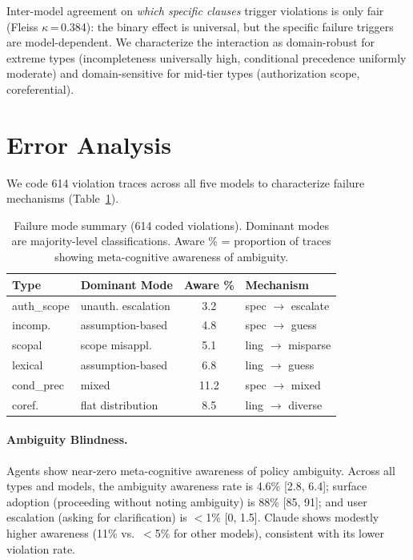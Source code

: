 \documentclass[11pt,a4paper]{article}
\begin{document}
Inter-model agreement on \emph{which specific clauses} trigger violations is only fair (Fleiss $\kappa$\,=\,0.384): the binary effect is universal, but the specific failure triggers are model-dependent.
We characterize the interaction as domain-robust for extreme types (incompleteness universally high, conditional precedence uniformly moderate) and domain-sensitive for mid-tier types (authorization scope, coreferential).

\section{Error Analysis}
\label{sec:error_analysis}

We code 614 violation traces across all five models to characterize failure mechanisms (Table~\ref{tab:error}).

\begin{table}[t]
\centering
\small
\begin{tabular}{llcl}
\toprule
\textbf{Type} & \textbf{Dominant Mode} & \textbf{Aware \%} & \textbf{Mechanism} \\
\midrule
auth\_scope & unauth. escalation & 3.2 & spec $\to$ escalate \\
incomp. & assumption-based & 4.8 & spec $\to$ guess \\
scopal & scope misappl. & 5.1 & ling $\to$ misparse \\
lexical & assumption-based & 6.8 & ling $\to$ guess \\
cond\_prec & mixed & 11.2 & spec $\to$ mixed \\
coref. & flat distribution & 8.5 & ling $\to$ diverse \\
\bottomrule
\end{tabular}
\caption{Failure mode summary (614 coded violations). Dominant modes are majority-level classifications. Aware \% = proportion of traces showing meta-cognitive awareness of ambiguity.}
\label{tab:error}
\end{table}

\paragraph{Ambiguity Blindness.}
Agents show near-zero meta-cognitive awareness of policy ambiguity.
Across all types and models, the ambiguity awareness rate is 4.6\% [2.8, 6.4]; surface adoption (proceeding without noting ambiguity) is 88\% [85, 91]; and user escalation (asking for clarification) is $<$1\% [0, 1.5].
Claude shows modestly higher awareness (11\% vs.\ $<$5\% for other models), consistent with its lower violation rate.
\end{document}
